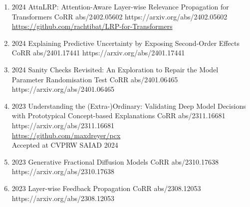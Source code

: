 {\begin{enumerate}
        \item {}
                        {2024}
                        {AttnLRP: Attention-Aware Layer-wise Relevance Propagation for Transformers}
                        {CoRR abs/2402.05602}
                        {https://arxiv.org/abs/2402.05602}
                        {\\\href{https://github.com/rachtibat/LRP-for-Transformers}{https://github.com/rachtibat/LRP-for-Transformers}}


        \item {}
                        {2024}
                        {Explaining Predictive Uncertainty by Exposing Second-Order Effects}
                        {CoRR abs/2401.17441}
                        {https://arxiv.org/abs/2401.17441}

        \item {}
                        {2024}
                        {Sanity Checks Revisited: An Exploration to Repair the Model Parameter Randomisation Test}
                        {CoRR abs/2401.06465}
                        {https://arxiv.org/abs/2401.06465}

        \item {}
                        {2023}
                        {Understanding the (Extra-)Ordinary: Validating Deep Model Decisions with
                        Prototypical Concept-based Explanations}
                        {CoRR abs/2311.16681}
                        {https://arxiv.org/abs/2311.16681}
                        {\\\href{https://github.com/maxdreyer/pcx}{https://github.com/maxdreyer/pcx}\\
                        Accepted at CVPRW SAIAD 2024}

        \item {}
                        {2023}
                        {Generative Fractional Diffusion Models}
                        {CoRR abs/2310.17638}
                        {https://arxiv.org/abs/2310.17638}

        \item {}
                        {2023}
                        {Layer-wise Feedback Propagation}
                        {CoRR abs/2308.12053}
                        {https://arxiv.org/abs/2308.12053}


\end{enumerate}}

